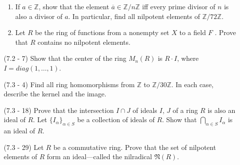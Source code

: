 \documentclass[12pt]{article}
\newcommand{\bz}{\mathbb{Z}}
\begin{document}
\begin{enumerate}
\begin{enumerate}
        \item If $a\in\bz$, show that the element
        $\overline{a}\in\bz/n\bz$ iff every prime divisor of $n$ is
        also a divisor
        of $a$. In particular, find all nilpotent elements
        of $\bz/72\bz$.

        \item Let $R$ be the ring of functions from a
        nonempty set $X$ to a field $F$ . Prove that $R$
        contains no nilpotent elements.
    \end{enumerate}
\begin{mybox}

\end{mybox}

\item[(7.2 - 7)] Show that the center of the ring $M_n(R)$
    is $R\cdot I$, where $I = diag(1,\ldots,1)$.
\begin{mybox}
    
\end{mybox}

\item[(7.3 - 4)] Find all ring homomorphisms from
    $\bz$ to $\bz/30\bz$. In each case, describe
    the kernel and the image.
\begin{mybox}

\end{mybox}

\item[(7.3 - 18)] Prove that the intersection $I\cap J$
    of ideals $I$, $J$ of a ring $R$ is also an ideal of
    $R$. Let $\{I_\alpha\}_{\alpha\in S}$ be a collection
    of ideals of $R$. Show that $\bigcap_{\alpha\in S}
    {I_\alpha}$ is an ideal of $R$.
\begin{mybox}

\end{mybox}

\item[(7.3 - 29)] Let $R$ be a commutative ring. Prove that
    the set of nilpotent elements of
    $R$ form an ideal—called the nilradical $\mathfrak{N}(R)$.
\begin{mybox}
    
\end{mybox}

\end{enumerate}
\end{document}
